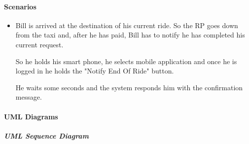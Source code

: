 \paragraph{Scenarios}
\begin{itemize}
	\item Bill is arrived at the destination of his current ride. So the RP goes down from the taxi and, after he has paid, Bill has to notify he has completed his current request. \par So he holds his smart phone, he selects \myTaxiService{} mobile application and once he is logged in he holds the "Notify End Of Ride" button. \par He waits some seconds and the system responds him with the confirmation message.
\end{itemize}
\paragraph{UML Diagrams}
\subparagraph{UML Sequence Diagram}
